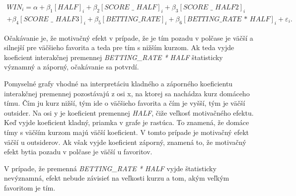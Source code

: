 \documentclass[
  digital, %
  twoside, %
  notable,   %
  lof,     %
  lot,     %
]{fithesis3}
\begin{document}
	\begin{multline}
	WIN_{i} = \alpha + \beta _{1} [\textit{HALF}]_{i} + \beta _{2} [\textit{SCORE~\_~HALF}]_{i} + \beta _{3} [\textit{SCORE~\_~HALF2}]_{i} \\
	+ \beta _{4} [\textit{SCORE~\_~HALF3}]_{i} + \beta _{5} [\textit{BETTING\_RATE}]_{i} + \beta _{6} [\textit{BETTING\_RATE * HALF}]_{i} + \varepsilon_{i}.
	\end{multline}
	
	Očakávanie je, že motivačný efekt v prípade, že je tím pozadu v polčase je väčší a silnejší pre väčšieho favorita a teda pre tím s nižším kurzom. Ak teda vyjde koeficient interakčnej premennej \textit{BETTING\_RATE * HALF} štatisticky významný a záporný, očakávanie sa potvrdí. 
	
	Pomyselné grafy vhodné na interpretáciu kladného a záporného koeficientu interakčnej premennej pozostávajú z osi x, na ktorej sa nachádza kurz domáceho tímu. Čím ju kurz nižší, tým ide o väčšieho favorita a čím je vyšší, tým je väčší outsider. Na osi y je koeficient premennej \textit{HALF}, čiže veľkosť motivačného efektu. Keď vyjde koeficient kladný, priamka v grafe je rastúca. To znamená, že domáce tímy s väčším kurzom majú väčší koeficient. V tomto prípade je motivačný efekt väčší u outsiderov. Ak však vyjde koeficient záporný, znamená to, že motivačný efekt bytia pozadu v polčase je väčší u favoritov.
	
	V prípade, že premenná \textit{BETTING\_RATE * HALF} vyjde štatisticky nevýznamná, efekt nebude závisieť na veľkosti kurzu a tom, akým veľkým favoritom je tím.
	
\end{document}
